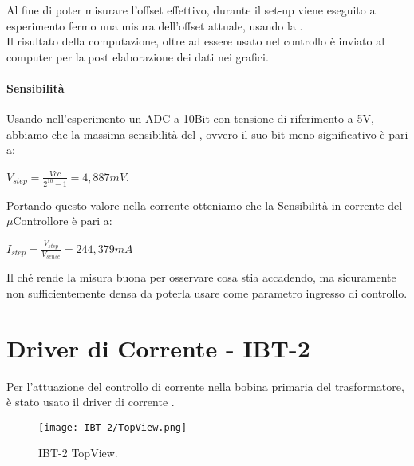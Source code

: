 Al fine di poter misurare l'offset effettivo, durante il set-up viene eseguito a esperimento fermo una misura dell'offset attuale, usando la .\\
Il risultato della computazione, oltre ad essere usato nel controllo è inviato al computer per la post elaborazione dei dati nei grafici.

\paragraph{Sensibilità}
Usando nell'esperimento un ADC a 10Bit con tensione di riferimento a 5V, abbiamo che la massima sensibilità del \microC, ovvero il suo bit meno significativo è pari a:\\

{\large\begin{center}
	$V_{step}=\frac{Vcc}{2^{10}-1} = 4,887mV$.\\
	
\end{center}}
Portando questo valore nella corrente otteniamo che la Sensibilità in corrente del $\mu$Controllore è pari a:\\

{\LARGE
\begin{center}
	$I_{step} =\frac{ V_{step}}{V_{sense}} = 244,379 mA$
\end{center}
}

Il ché rende la misura buona per osservare cosa stia accadendo, ma sicuramente non sufficientemente densa da poterla usare come parametro ingresso di controllo.

\newpage

\section{Driver di Corrente - IBT-2}\label{CurrentDriver}
Per l'attuazione del controllo di corrente nella bobina primaria del trasformatore, è stato usato il driver di corrente \cite{IBT-2} .


\begin{figure}[h]
	\centering
	\texttt{[image: IBT-2/TopView.png]}
	\caption[Driver Motori IBT-2 TopView \& PinOut]{IBT-2 TopView.}
\end{figure}

